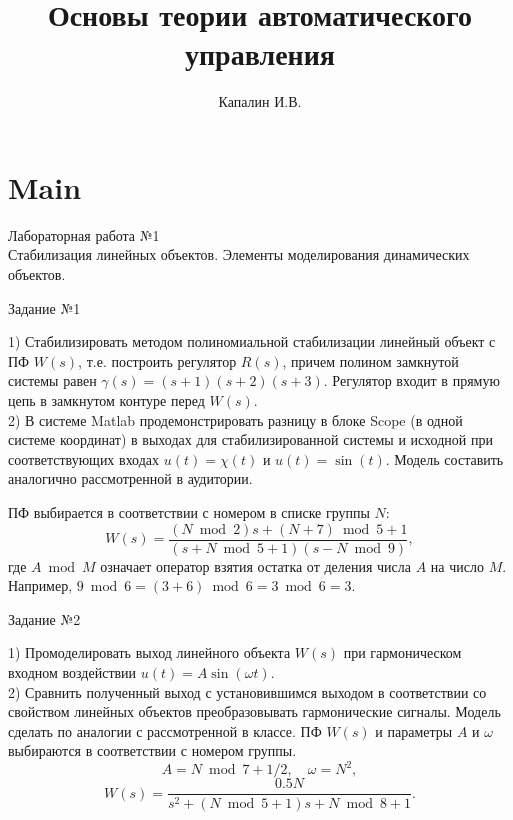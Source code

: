 \documentclass{beamer}
\title[Основы теории автоматического управления]{Основы теории автоматического управления}
\author{Капалин И.В.}
\institute[\text{МИСиС ИК}]{НИТУ МИСиС\\ Кафедра инженерной кибернетики}
\theoremstyle{plain}
\theoremstyle{definition}
\theoremstyle{remark}
\theoremstyle{plain}
\begin{document}
\section{Main}

\begin{frame}

    \begin{center}
    {\LARGE
    Лабораторная работа №1\\
    Стабилизация линейных объектов. Элементы моделирования динамических объектов. }
    \end{center}

\end{frame}


\begin{frame}{Задание №1}


    1) Стабилизировать методом полиномиальной стабилизации линейный объект с ПФ $W(s)$, т.е. построить регулятор $R(s)$, причем полином замкнутой системы равен
    $\gamma(s) = (s+1)(s+2)(s+3)$. 
    Регулятор входит в прямую цепь в замкнутом контуре перед $W(s)$. \cite[с.93?]{kim:prac}\\
    2) В системе Matlab продемонстрировать разницу в блоке Scope (в одной системе координат) в выходах для стабилизированной системы и исходной при соответствующих входах 
    $u(t) = \chi(t)$ и $u(t) = \sin(t)$. 
    Модель составить аналогично рассмотренной в аудитории.

    ПФ выбирается в соответствии с номером в списке группы $N$:
    $$
        W(s) = \frac{(N\bmod 2)s+(N+7)\bmod 5+1}{(s+ N\bmod 5 + 1 )(s- N\bmod 9)},
    $$
    где $A \bmod  M$ означает оператор взятия остатка от деления числа $A$ на число $M$.
    Например, 
    $ 9\bmod 6 = (3+6)\bmod 6 = 3\bmod  6 = 3$.

\end{frame}

\begin{frame}{Задание №2}

    1) Промоделировать выход линейного объекта $W(s)$ при гармоническом входном воздействии 
    $u(t) = A\sin(\omega t)$.\\
    2) Сравнить полученный выход с установившимся выходом в соответствии со свойством линейных объектов преобразовывать гармонические сигналы. Модель сделать по аналогии с рассмотренной в классе. ПФ $W(s)$ и параметры $A$ и $\omega$ выбираются в соответствии с номером группы.
    $$
        A = N\bmod 7+1/2, \quad \omega = N^2,
    $$
    $$
        W(s)= \frac{0.5N}{s^2+(N\bmod  5 +1)s+ N\bmod  8 +1}.
    $$


\end{frame}
\end{document}
